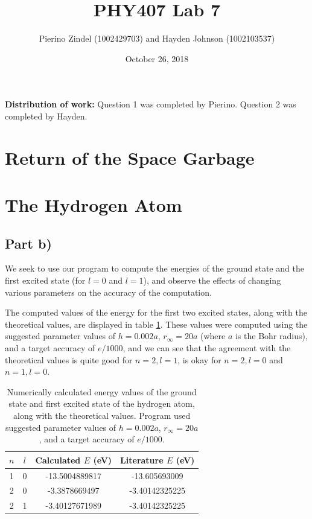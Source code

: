 \documentclass{article}
\title{PHY407 Lab 7}
\author{Pierino Zindel (1002429703) and Hayden Johnson (1002103537)}
\date{October 26, 2018}
\begin{document}
\maketitle

\noindent \textbf{Distribution of work:} Question 1 was completed by Pierino. Question 2 was completed by Hayden.

\section{Return of the Space Garbage}

\section{The Hydrogen Atom}

\subsection{Part b)}

We seek to use our program to compute the energies of the ground state and the first excited state (for $l=0$ and $l=1$), and observe the effects of changing various parameters on the accuracy of the computation.

The computed values of the energy for the first two excited states, along with the theoretical values, are displayed in table \ref{tab:2b_i}. These values were computed using the suggested parameter values of $h=0.002a$, $r_\infty=20a$ (where $a$ is the Bohr radius), and a target accuracy of $e/1000$, and we can see that the agreement with the theoretical values is quite good for $n=2, l=1$, is okay for $n=2, l=0$ and $n=1, l=0$.

\begin{table}[H]
	\centering
	\caption{Numerically calculated energy values of the ground state and first excited state of the hydrogen atom, along with the theoretical values. Program used suggested parameter values of $h=0.002a$, $r_\infty=20a$, and a target accuracy of $e/1000$.}
	\label{tab:2b_i}
	\begin{tabular}{c|c|c|c}
		$n$ & $l$ & Calculated $E$ (eV)  & Literature $E$ (eV) \\
		\hline
		1 & 0 & -13.5004889817 & -13.605693009 \\
		2 & 0 & -3.3878669497 & -3.40142325225 \\
		2 & 1 & -3.40127671989 & -3.40142325225 \\
	\end{tabular}
\end{table}
\end{document}
